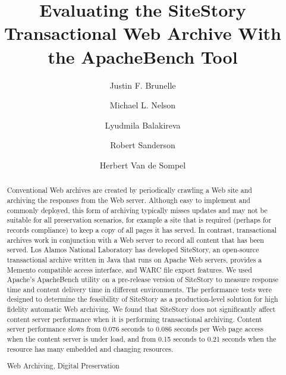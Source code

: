 \documentclass[runningheads,a4paper]{llncs}
\newcommand{\keywords}[1]{\par\addvspace\baselineskip
\noindent\keywordname\enspace\ignorespaces#1}
\begin{document}
\mainmatter

\title{Evaluating the SiteStory Transactional Web Archive With the ApacheBench Tool}

\author{Justin F. Brunelle \and Michael L. Nelson \and Lyudmila Balakireva \and Robert Sanderson \and Herbert Van de Sompel
}



%
%

\maketitle


\begin{abstract}
\sloppy Conventional Web archives are created by periodically crawling a Web
site and archiving the responses from the Web server.  Although easy to
implement and commonly deployed, this form of archiving typically misses
updates and  may not be suitable for all preservation scenarios, for
example a site that is required (perhaps for records compliance) to keep
a copy of all pages it has served.  In contrast, transactional archives
work in conjunction with a Web server to record all content that has
been served.  Los Alamos National Laboratory has developed SiteStory, an
open-source transactional archive written in Java that
runs on Apache Web servers, provides a Memento compatible access
interface, and WARC file export features. We used Apache's ApacheBench
utility on a pre-release version of SiteStory to measure response time and
content delivery time in different environments. 
The performance tests were designed to determine the
feasibility of SiteStory as a production-level solution for high
fidelity automatic Web archiving.  We found that SiteStory does not
significantly affect content server performance when it is performing
transactional archiving.  Content server performance slows from 0.076
seconds to 0.086 seconds per Web page access when the content server is
under load, and from 0.15 seconds to 0.21 seconds when the resource has
many embedded and changing resources.\fussy

\keywords{Web Archiving, Digital Preservation}
\end{abstract}
\end{document}

